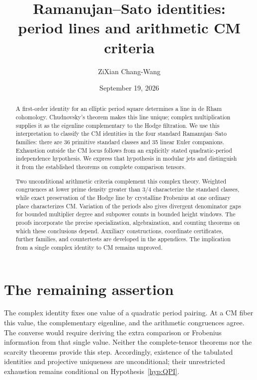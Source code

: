 \documentclass[10pt,a4paper,reqno]{amsart}
\title[Period lines and arithmetic CM criteria]{Ramanujan--Sato identities:\\period lines and arithmetic CM criteria}
\author{ZiXian Chang-Wang}
\date{September 19, 2026}
\numberwithin{equation}{section}
\theoremstyle{definition}\newtheorem{definition}[theorem]{Definition}
\theoremstyle{remark}\newtheorem{remark}[theorem]{Remark}
\begin{document}
\begin{abstract}
A first-order identity for an elliptic period square determines a line
in de Rham cohomology. Chudnovsky's theorem makes this line unique;
complex multiplication supplies it as the eigenline complementary to
the Hodge filtration. We use this interpretation to classify the CM
identities in the four standard Ramanujan--Sato families: there are
36 primitive standard classes and 35 linear Euler companions.
Exhaustion outside the CM locus follows from an explicitly stated
quadratic-period independence hypothesis. We express that hypothesis
in modular jets and distinguish it from the established theorems on
complete comparison tensors.

Two unconditional arithmetic criteria complement this complex theory.
Weighted congruences at lower prime density greater than $3/4$
characterize the standard classes, while exact preservation of the
Hodge line by crystalline Frobenius at one ordinary place characterizes
CM. Variation of the periods also gives divergent denominator gaps for
bounded multiplier degree and subpower counts in bounded height
windows. The proofs incorporate the precise specialization,
algebraization, and counting theorems on which these conclusions
depend. Auxiliary constructions, coordinate certificates, further
families, and countertests are developed in the appendices.
The implication from a single complex identity to CM remains unproved.
\end{abstract}
\maketitle
\tableofcontents








\section*{The remaining assertion}
The complex identity fixes one value of a quadratic period pairing.
At a CM fiber this value, the complementary eigenline, and the
arithmetic congruences agree. The converse would require deriving
the extra comparison or Frobenius information from that single value.
Neither the complete-tensor theorems nor the scarcity theorems provide
this step. Accordingly, existence of the tabulated identities and
projective uniqueness are unconditional; their unrestricted exhaustion
remains conditional on Hypothesis~\ref{hyp:QPI}.
\end{document}
